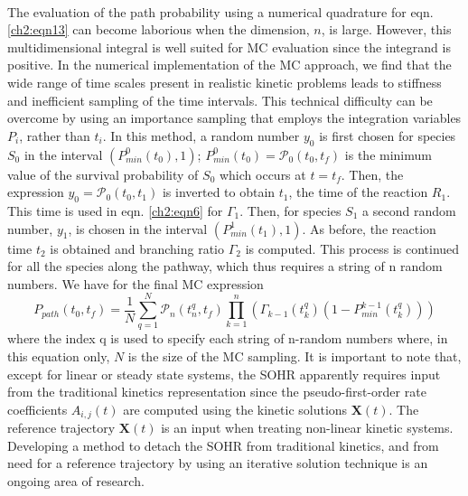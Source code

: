 \paragraph{}
The evaluation of the path probability using a numerical quadrature for eqn. \ref{ch2:eqn13} can become laborious when the dimension, $n$, is large. However, this multidimensional
integral is well suited for MC evaluation since the integrand is positive. In
the numerical implementation of the MC approach, we find that the wide range of time
scales present in realistic kinetic problems leads to stiffness and inefficient sampling of
the time intervals. This technical difficulty can be overcome by using an importance
sampling that employs the integration variables $P_i$, rather than $t_i$. In this method, a random
number $y_0$ is first chosen for species $S_0$ in the interval $\left(P_{min}^{0}(t_0),1\right)$; $P_{min}^{0}(t_0) = \mathcal{P}_0(t_0, t_f)$ is the minimum value of the survival probability of $S_0$ which
occurs at $t = t_f$. Then, the expression $y_0=\mathcal{P}_0(t_0,t_1)$ is inverted to obtain $t_1$, the time of
the reaction $R_1$. This time is used in eqn. \ref{ch2:eqn6} for $\Gamma_{1}$. Then, for species $S_1$ a second
random number, $y_1$, is chosen in the interval $\left(P_{min}^{1}(t_1),1\right)$. As before, the reaction
time $t_2$ is obtained and branching ratio $\Gamma_2$ is computed. This process is continued for
all the species along the pathway, which thus requires a string of n random numbers.
We have for the final MC expression
\begin{equation}
\label{ch2:eqn14}
P_{path}(t_0,t_f)= \frac{1}{N} \sum_{q=1}^{N} {\mathcal{P}_n(t_n^q, t_f) \prod_{k=1}^{n} \left( \Gamma_{k-1}(t_k^{q})\left( 1-P_{min}^{k-1}(t_k^q)\right)  \right) }
\end{equation}
where the index q is used to specify each string of n-random numbers where, in this
equation only, $N$ is the size of the MC sampling. It is important to note that, except for
linear or steady state systems, the SOHR apparently requires input from the traditional
kinetics representation since the pseudo-first-order rate coefficients $A_{i,j}(t)$ are computed
using the kinetic solutions $\mathbf{X}(t)$. The reference trajectory $\mathbf{X}(t)$ is an input when treating
non-linear kinetic systems. Developing a method to detach the SOHR from traditional
kinetics, and from need for a reference trajectory by using an iterative solution technique
is an ongoing area of research.\cite{ch1_IRPC_18_bai2017simulating}

